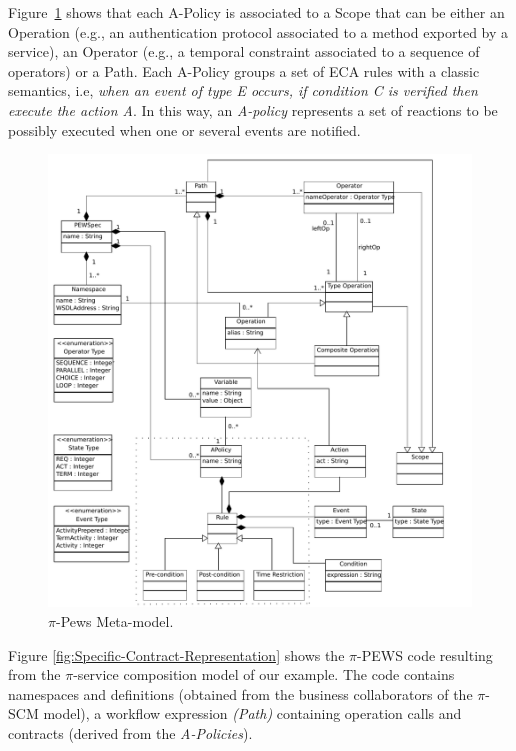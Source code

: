 \documentclass{singlecol-new}
\theoremstyle{TH}{
\newtheorem{lemma}{Lemma}
\newtheorem{theorem}[lemma]{Theorem}
\newtheorem{corrolary}[lemma]{Corrolary}
\newtheorem{conjecture}[lemma]{Conjecture}
\newtheorem{proposition}[lemma]{Proposition}
\newtheorem{claim}[lemma]{Claim}
\newtheorem{stheorem}[lemma]{Wrong Theorem}
\newtheorem{algorithm}{Algorithm}
}
\theoremstyle{THrm}{
\newtheorem{definition}{Definition}[section]
\newtheorem{question}{Question}[section]
\newtheorem{remark}{Remark}
\newtheorem{scheme}{Scheme}
}
\theoremstyle{THhit}{
\newtheorem{case}{Case}[section]
}
\theoremstyle{THhsl}{
\newtheorem{example}{Example}
}
\begin{document}
Figure~\ref{fig:PPEWSmetamodel} shows that each {\sc A-Policy} is associated to a {\sc Scope} that can be either an {\sc Operation} (e.g., an authentication protocol associated to a method exported by a service),  an {\sc Operator} (e.g., a temporal constraint associated to a sequence of operators) or a {\sc Path}.
Each {\sc A-Policy} groups a set of ECA rules with a classic semantics, i.e, {\em when an event of type E occurs, if condition C is verified then execute the action A}.
In this way, an {\em A-policy} represents a set of reactions to be possibly executed when one or several events are notified.

\begin{figure}[h]
\centering
\includegraphics[width=1\textwidth]{./figures/PEWSMetamodel}
\caption{$\pi$-{\sc Pews} Meta-model.}
\label{fig:PPEWSmetamodel}
\end{figure}

\begin{example}\label{ex:toPublicMusic5}
Figure \ref{fig:Specific-Contract-Representation} shows the $\pi$-PEWS code resulting from the $\pi$-service composition model of our example.
The code contains namespaces and definitions (obtained from the business collaborators of the $\pi$-SCM model), a workflow expression \textit{(Path)} containing operation calls and contracts (derived from the \textit{A-Policies}).
\end{example}
\end{document}
